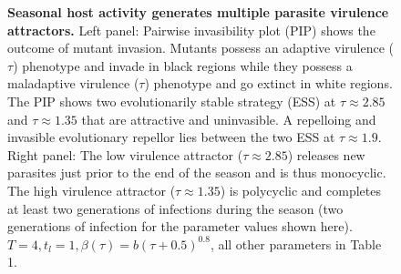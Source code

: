 \documentclass{article}
\begin{document}
\begin{figure}[hb!]
\begin{subfigure}[t]{0.3\textwidth}
  \end{subfigure}\hspace{1.5cm}
    \caption{\textbf{Seasonal host activity generates multiple parasite virulence attractors.} Left panel: Pairwise invasibility plot (PIP) shows the outcome of mutant invasion. Mutants possess an adaptive virulence ($\tau$) phenotype and invade in black regions while they possess a maladaptive virulence ($\tau$) phenotype and go extinct in white regions. The PIP shows two evolutionarily stable strategy (ESS) at $\tau \approx 2.85$ and $\tau \approx 1.35$ that are attractive and uninvasible. A repelloing and invasible evolutionary repellor lies between the two ESS at $\tau \approx 1.9$. Right panel: The low virulence attractor ($\tau \approx 2.85$) releases new parasites just prior to the end of the season and is thus monocyclic. The high virulence attractor ($\tau \approx 1.35$) is polycyclic and completes at least two generations of infections during the season (two generations of infection for the parameter values shown here). $T = 4, t_{l} = 1, \beta(\tau) = b (\tau+ 0.5)^{0.8}$, all other parameters in Table 1. }
\end{figure}
\end{document}
